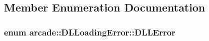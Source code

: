 \subsection{Member Enumeration Documentation}
\hypertarget{classarcade_1_1_d_l_loading_error_a84cd98868dfc8c4a27e8e524919778ab}{
\subsubsection[{D\-L\-L\-Error}]{\setlength{\rightskip}{0pt plus 5cm}enum {\bf arcade\-::\-D\-L\-Loading\-Error\-::\-D\-L\-L\-Error}\hspace{0.3cm}{\ttfamily [strong]}}}\label{classarcade_1_1_d_l_loading_error_a84cd98868dfc8c4a27e8e524919778ab}
